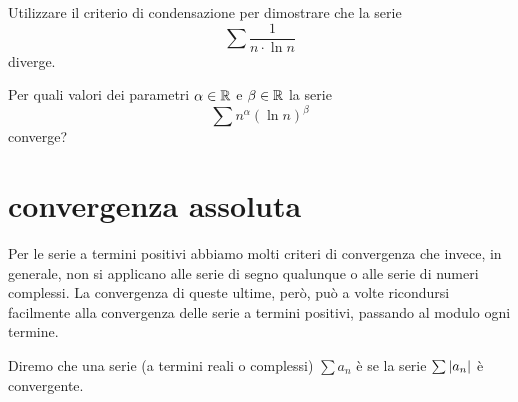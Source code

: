 \begin{exercise}
Utilizzare il criterio di condensazione per dimostrare che la serie
\[
  \sum \frac{1}{n \cdot \ln n}
\]
diverge.
\end{exercise}

\begin{exercise}
  Per quali valori dei parametri $\alpha\in \mathbb R$ e $\beta\in \mathbb R$
  la serie
  \[
    \sum n^\alpha (\ln n)^\beta
  \]
  converge?
\end{exercise}

\section{convergenza assoluta}

Per le serie a termini positivi abbiamo molti criteri di convergenza
che invece, in generale, non si applicano alle serie di segno qualunque
o alle serie di numeri complessi.
La convergenza di queste ultime, però, può a volte ricondursi
facilmente
alla
convergenza delle serie a termini positivi, passando al modulo
ogni termine.

\begin{definition}
\mymark{***}
Diremo che una serie (a termini reali o complessi) $\sum a_n$
è  se la serie $\sum {\left|a_n\right|}$
è convergente.
\end{definition}

